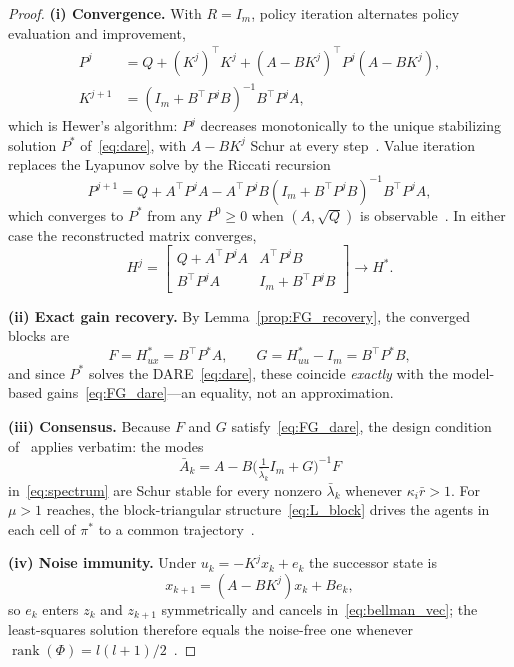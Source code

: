 \documentclass[12pt]{elsarticle}
\theoremstyle{remark}
\DeclareMathOperator{\rank}{rank}
\begin{document}
\begin{proof}
\textbf{(i) Convergence.} With $R = I_m$, policy iteration alternates policy evaluation and improvement,
\begin{align*}
P^j &= Q + (K^j)^\top K^j + (A - BK^j)^\top P^j (A - BK^j),\\
K^{j+1} &= (I_m + B^\top P^j B)^{-1} B^\top P^j A,
\end{align*}
which is Hewer's algorithm: $P^j$ decreases monotonically to the unique stabilizing solution $P^*$ of~\eqref{eq:dare}, with $A-BK^j$ Schur at every step~\cite{hewer1971}. Value iteration replaces the Lyapunov solve by the Riccati recursion
\begin{equation*}
P^{j+1} = Q + A^\top P^j A - A^\top P^j B (I_m + B^\top P^j B)^{-1} B^\top P^j A,
\end{equation*}
which converges to $P^*$ from any $P^0 \geq 0$ when $(A, \sqrt{Q})$ is observable~\cite{lewis2009,rizvi2022}. In either case the reconstructed matrix converges,
\begin{equation*}
H^j = \begin{bmatrix} Q+A^\top P^j A & A^\top P^j B\\[1pt] B^\top P^j A & I_m + B^\top P^j B\end{bmatrix} \longrightarrow H^*.
\end{equation*}

\textbf{(ii) Exact gain recovery.} By Lemma~\ref{prop:FG_recovery}, the converged blocks are
\begin{equation*}
F = H_{ux}^* = B^\top P^* A, \qquad G = H_{uu}^* - I_m = B^\top P^* B,
\end{equation*}
and since $P^*$ solves the DARE~\eqref{eq:dare}, these coincide \emph{exactly} with the model-based gains~\eqref{eq:FG_dare}---an equality, not an approximation.

\textbf{(iii) Consensus.} Because $F$ and $G$ satisfy~\eqref{eq:FG_dare}, the design condition of~\cite[Thm.~3.1]{cacace2024} applies verbatim: the modes
\begin{equation*}
\bar{A}_k = A - B\Big(\tfrac{1}{\bar{\lambda}_k} I_m + G\Big)^{-1} F
\end{equation*}
in~\eqref{eq:spectrum} are Schur stable for every nonzero $\bar{\lambda}_k$ whenever $\kappa_i \bar{r} > 1$. For $\mu > 1$ reaches, the block-triangular structure~\eqref{eq:L_block} drives the agents in each cell of $\pi^*$ to a common trajectory~\cite[Thm.~4.1]{cacace2024}.

\textbf{(iv) Noise immunity.} Under $u_k = -K^j x_k + e_k$ the successor state is
\begin{equation*}
x_{k+1} = (A - BK^j)x_k + B e_k,
\end{equation*}
so $e_k$ enters $z_k$ and $z_{k+1}$ symmetrically and cancels in~\eqref{eq:bellman_vec}; the least-squares solution therefore equals the noise-free one whenever $\rank(\Phi) = l(l+1)/2$~\cite{bradtke1994,rizvi2022}.
\end{proof}
\end{document}
